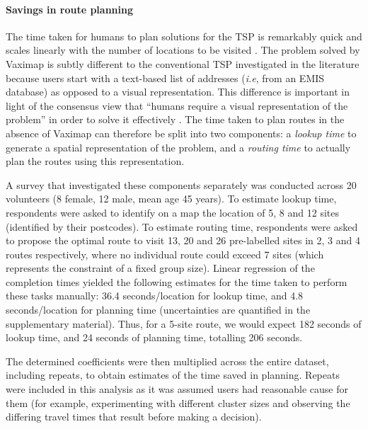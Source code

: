 \documentclass{article}
\def\vm{Vaximap}
\begin{document}
\paragraph{Savings in route planning}
The time taken for humans to plan solutions for the TSP is remarkably quick and scales linearly with the number of locations to be visited \cite{Macgregor1996, Dry2006, MacGregor2011}. The problem solved by \vm{} is subtly different to the conventional TSP investigated in the literature because users start with a text-based list of addresses (\textit{i.e}, from an EMIS database) as opposed to a visual representation. This difference is important in light of the consensus view that ``humans require a visual representation of the problem'' in order to solve it effectively \cite{MacGregor2011}. The time taken to plan routes in the absence of \vm{} can therefore be split into two components: a \textit{lookup time} to generate a spatial representation of the problem, and a \textit{routing time} to actually plan the routes using this representation.

A survey that investigated these components separately was conducted across 20 volunteers (8 female, 12 male, mean age 45 years). To estimate lookup time, respondents were asked to identify on a map the location of 5, 8 and 12 sites (identified by their postcodes). To estimate routing time, respondents were asked to propose the optimal route to visit 13, 20 and 26 pre-labelled sites in 2, 3 and 4 routes respectively, where no individual route could exceed 7 sites (which represents the constraint of a fixed group size). Linear regression of the completion times yielded the following estimates for the time taken to perform these tasks manually: 36.4 seconds/location for lookup time, and 4.8 seconds/location for planning time (uncertainties are quantified in the supplementary material). Thus, for a 5-site route, we would expect 182 seconds of lookup time, and 24 seconds of planning time, totalling 206 seconds.

The determined coefficients were then multiplied across the entire dataset, including repeats, to obtain estimates of the time saved in planning. Repeats were included in this analysis as it was assumed users had reasonable cause for them (for example, experimenting with different cluster sizes and observing the differing travel times that result before making a decision).
\end{document}
